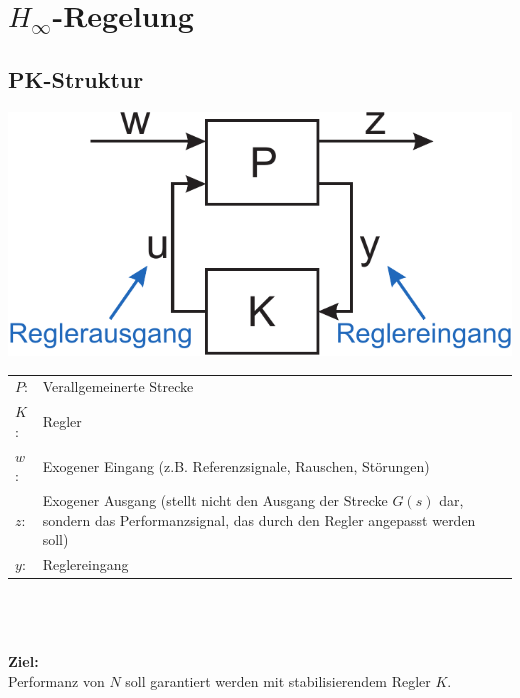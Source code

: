 \documentclass[a4paper,twocolumn,10pt]{article}
\begin{document}
\section{$H_{\infty}$-Regelung}
\subsection{PK-Struktur}
\begin{center}
\includegraphics[width=0.8\columnwidth]{Grafiken/PK-Struktur}
\end{center}
\begin{tabular}{p{1cm}p{8cm}}
$P$: & Verallgemeinerte Strecke\\
$K$: & Regler\\
$w$: & Exogener Eingang (z.B. Referenzsignale, Rauschen, Störungen)\\
$z$: & Exogener Ausgang (stellt nicht den Ausgang der Strecke $G(s)$ dar, sondern das Performanzsignal, das durch den Regler angepasst werden soll)\\
$y$: & Reglereingang
\end{tabular}\\\\\\
\textbf{Ziel:}\\
Performanz von $N$ soll garantiert werden mit stabilisierendem Regler $K$.
\end{document}
